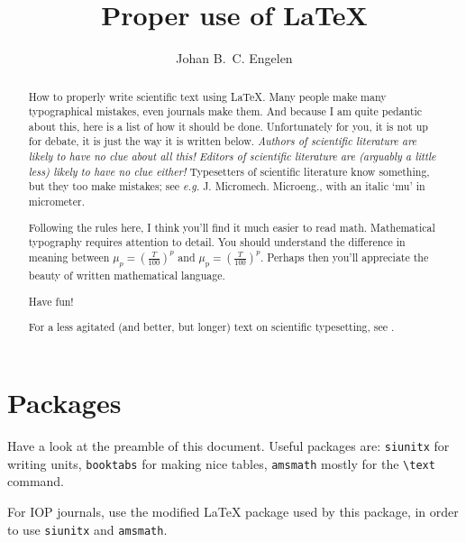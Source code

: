 \documentclass[fleqn, 12pt]{iopart-mod}
\begin{document}
\title{Proper use of \LaTeX{}}

\author{Johan B.~C. Engelen}

\address{University of Twente, Enschede, the Netherlands} 
        
\begin{abstract}
How to properly  write scientific text using \LaTeX{}. Many people make many typographical mistakes, even journals make them. And because I am quite pedantic about this, here is a list of how it should be done. Unfortunately for you, it is not up for debate, it is just the way it is written below. 
\emph{Authors of scientific literature are likely to have no clue about all this!}
\emph{Editors of scientific literature are (arguably a little less) likely to have no clue either!} 
Typesetters of scientific literature know something, but they too make mistakes; see \emph{e.g.} J. Micromech. Microeng., with an italic `mu' in micrometer. 

Following the rules here, I think you'll find it much easier to read math. Mathematical typography requires attention to detail. 
You should understand the difference in meaning between $\mu_p = \left(\frac{T}{100}\right)^p$ and $\mu_\text{p} = \left(\frac{T}{100}\right)^p$.
Perhaps then you'll appreciate the beauty of written mathematical language.

Have fun!

\vspace{5em}
For a less agitated (and better, but longer) text on scientific typesetting, see \cite{Beccari1997}.
\end{abstract}

\maketitle

\RaggedRight

\section{Packages}
Have a look at the preamble of this document. Useful packages are: \verb|siunitx| for writing units, \verb|booktabs| for making nice tables, \verb|amsmath| mostly for the \verb|\text| command.

For IOP journals, use the modified LaTeX package used by this package, in order to use \verb|siunitx| and \verb|amsmath|.
\end{document}
